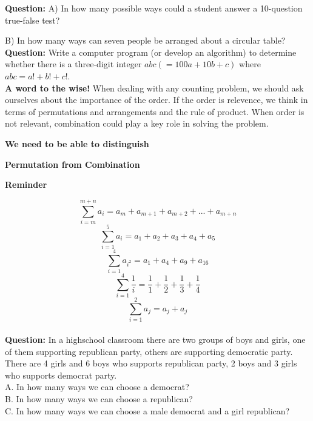 \documentclass[11pt]{article}
\begin{document}
\textbf{Question:} A) In how many possible ways could a student answer a 10-question true-false test?

B) In how many ways can seven people be arranged about a circular table?
\\

\textbf{Question:}  Write a computer program (or develop an algorithm) to determine whether there is a three-digit integer $abc (= 100a + 10b + c)$ where $abc = a! + b! + c!$.
\\

\textbf{A word to the wise!} When dealing with any counting problem, we should ask ourselves about the importance of the order. If the order is relevence, we think in terms of permutations and arrangements and the rule of product. When order is not relevant, combination could play a key role in solving the problem.
\\

\begin{center}
\textbf{We need to be able to distinguish}

\textbf{Permutation from Combination}
\end{center}


\begin{center}
\textbf{Reminder}
\end{center}

$$\sum\limits_{i = m}^{m+n}{a_i = a_m+a_{m+1}+a_{m+2}+...+a_{m+n}}$$
$$\sum\limits_{i = 1}^5{a_i = a_1+a_2+a_3+a_4+a_5}$$
$$\sum\limits_{i = 1}^4{a_{i^2} = a_1+a_4+a_9+a_{16}}$$
$$\sum\limits_{i = 1}^4{\frac{1}{i} =\frac{1}{1}+\frac{1}{2}+\frac{1}{3}+\frac{1}{4}}$$
$$\sum\limits_{i = 1}^2{a_j = a_j+a_j}$$
\\

\textbf{Question:} In a highschool classroom there are two groups of boys and girls, one of them supporting republican party, others are supporting democratic party. There are 4 girls and 6 boys who supports republican party, 2 boys and 3 girls who supports democrat party.\\
A. In how many ways we can choose a democrat?\\
B. In how many ways we can choose a republican?\\
C. In how many ways we can choose a male democrat and a girl republican?\\
\\
\end{document}
